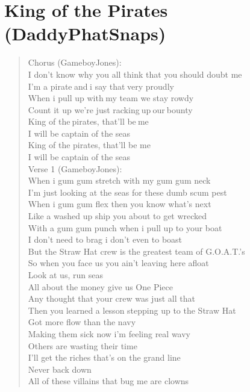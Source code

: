 \documentclass[11pt]{article}
\begin{document}
\section{King of the Pirates (DaddyPhatSnaps)}
\label{sec:orgeb8d890}
\begin{verse}
Chorus (GameboyJones):\\
I don't know why you all think that you should doubt me\\
I’m a pirate and i say that very proudly\\
When i pull up with my team we stay rowdy\\
Count it up we're just racking up our bounty\\
King of the pirates, that'll be me\\
I will be captain of the seas\\
King of the pirates, that’ll be me\\
I will be captain of the seas\\
\vspace*{1em}
Verse 1 (GameboyJones):\\
When i gum gum stretch with my gum gum neck\\
I'm just looking at the seas for these dumb scum pest\\
When i gum gum flex then you know what's next\\
Like a washed up ship you about to get wrecked\\
With a gum gum punch when i pull up to your boat\\
I don't need to brag i don't even to boast\\
But the Straw Hat crew is the greatest team of G.O.A.T.'s\\
So when you face us you ain't leaving here afloat\\
Look at us, run seas\\
All about the money give us One Piece\\
Any thought that your crew was just all that\\
Then you learned a lesson stepping up to the Straw Hat\\
Got more flow than the navy\\
Making them sick now i'm feeling real wavy\\
Others are wasting their time\\
I’ll get the riches that’s on the grand line\\
Never back down\\
All of these villains that bug me are clowns\\

\end{verse}
\end{document}
